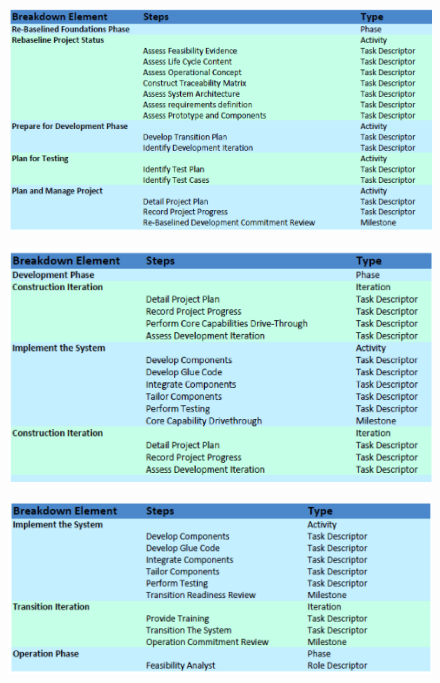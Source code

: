 \begin{figure}[!htbp]
\centering
\includegraphics[scale=0.5]{images/table1.png}
\end{figure}
\begin{figure}[!htbp]
\centering
\includegraphics[scale=0.5]{images/table2.png}
\end{figure}
\begin{figure}[!htbp]
\centering
\includegraphics[scale=0.5]{images/table3.png}
\end{figure}

